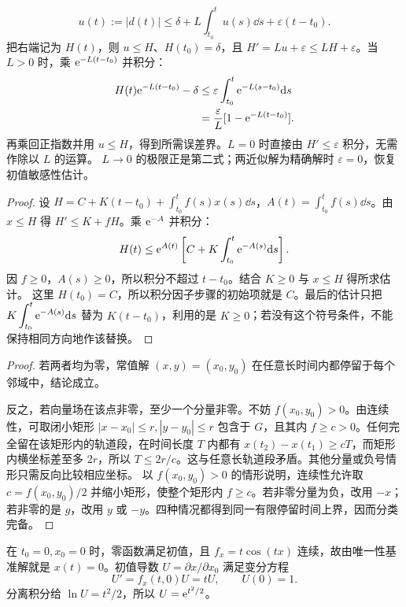 \[
u(t):=|d(t)|\le\delta+L\int_{t_0}^tu(s)\dd s+\varepsilon(t-t_0).
\]
把右端记为 $H(t)$，则 $u\le H$、$H(t_0)=\delta$，且 $H'=Lu+\varepsilon\le LH+\varepsilon$。当 $L>0$ 时，乘 $\mathrm e^{-L(t-t_0)}$ 并积分：
\[
\begin{aligned}
H(t)\mathrm e^{-L(t-t_0)}-\delta
&\le\varepsilon\int_{t_0}^t\mathrm e^{-L(s-t_0)}\mathrm d s\\
&=\dfrac\varepsilon L[1-\mathrm e^{-L(t-t_0)}].
\end{aligned}
\]
再乘回正指数并用 $u\le H$，得到所需误差界。$L=0$ 时直接由 $H'\le\varepsilon$ 积分，无需作除以 $L$ 的运算。
$L\to0$ 的极限正是第二式；两近似解为精确解时 $\varepsilon=0$，恢复初值敏感性估计。
\begin{proof}
设 $H=C+K(t-t_0)+\displaystyle\int_{t_0}^tf(s)x(s)\dd s$，$A(t)=\displaystyle\int_{t_0}^tf(s)\dd s$。由 $x\le H$ 得 $H'\le K+fH$。乘 $\mathrm e^{-A}$ 并积分：
\[
 H(t)\le\mathrm e^{A(t)}\left[C+K\int_{t_0}^t\mathrm e^{-A(s)}\mathrm d s\right].
\]
因 $f\ge0$，$A(s)\ge0$，所以积分不超过 $t-t_0$。结合 $K\ge0$ 与 $x\le H$ 得所求估计。
这里 $H(t_0)=C$，所以积分因子步骤的初始项就是 $C$。最后的估计只把 $\displaystyle K\int_{t_0}^t\mathrm e^{-A(s)}\mathrm d s$ 替为 $K(t-t_0)$，利用的是 $K\ge0$；若没有这个符号条件，不能保持相同方向地作该替换。
\end{proof}
\begin{proof}
若两者均为零，常值解 $(x,y)=(x_0,y_0)$ 在任意长时间内都停留于每个邻域中，结论成立。

反之，若向量场在该点非零，至少一个分量非零。不妨 $f(x_0,y_0)>0$。由连续性，可取闭小矩形 $|x-x_0|\le r,|y-y_0|\le r$ 包含于 $G$，且其内 $f\ge c>0$。任何完全留在该矩形内的轨道段，在时间长度 $T$ 内都有 $x(t_2)-x(t_1)\ge cT$，而矩形内横坐标差至多 $2r$，所以 $T\le2r/c$。这与任意长轨道段矛盾。其他分量或负号情形只需反向比较相应坐标。
以 $f(x_0,y_0)>0$ 的情形说明，连续性允许取 $c=f(x_0,y_0)/2$ 并缩小矩形，使整个矩形内 $f\ge c$。若非零分量为负，改用 $-x$；若非零的是 $g$，改用 $y$ 或 $-y$。四种情况都得到同一有限停留时间上界，因而分类完备。
\end{proof}
在 $t_0=0,x_0=0$ 时，零函数满足初值，且 $f_x=t\cos(tx)$ 连续，故由唯一性基准解就是 $x(t)=0$。初值导数 $U=\partial x/\partial x_0$ 满足变分方程
\[
U'=f_x(t,0)U=tU,\qquad U(0)=1.
\]
分离积分给 $\ln U=t^2/2$，所以 $U=\mathrm e^{t^2/2}$。

